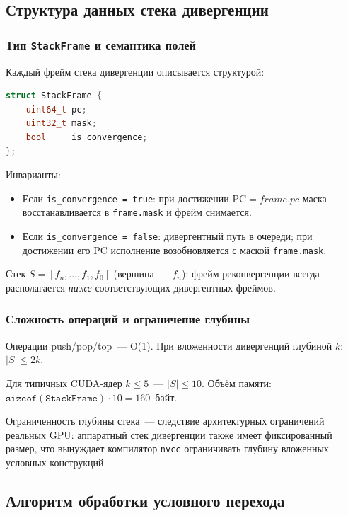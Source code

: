 \subsection{Структура данных стека дивергенции}

\subsubsection{Тип \texttt{StackFrame} и семантика полей}

Каждый фрейм стека дивергенции описывается структурой:

\begin{lstlisting}[language=C++, caption={Структура StackFrame}]
struct StackFrame {
    uint64_t pc;
    uint32_t mask;
    bool     is_convergence;
};
\end{lstlisting}

Инварианты:
\begin{itemize}
  \item Если \texttt{is\_convergence~= true}: при достижении
        $\mathrm{PC} = \mathit{frame.pc}$ маска восстанавливается
        в \texttt{frame.mask} и фрейм снимается.
  \item Если \texttt{is\_convergence~= false}: дивергентный путь
        в очереди; при достижении его PC исполнение возобновляется
        с маской \texttt{frame.mask}.
\end{itemize}

Стек $S = [f_n, \ldots, f_1, f_0]$ (вершина~--- $f_n$):
фрейм реконвергенции всегда располагается \textit{ниже}
соответствующих дивергентных фреймов.

\subsubsection{Сложность операций и ограничение глубины}

Операции push/pop/top~--- O(1). При вложенности дивергенций
глубиной $k$: $|S| \leq 2k$.

Для типичных CUDA-ядер $k \leq 5$~--- $|S| \leq 10$.
Объём памяти: $\texttt{sizeof}(\texttt{StackFrame}) \cdot 10 = 160$~байт.

Ограниченность глубины стека~--- следствие архитектурных ограничений
реальных GPU: аппаратный стек дивергенции также имеет фиксированный размер,
что вынуждает компилятор \texttt{nvcc} ограничивать глубину вложенных
условных конструкций.

\subsection{Алгоритм обработки условного перехода}

